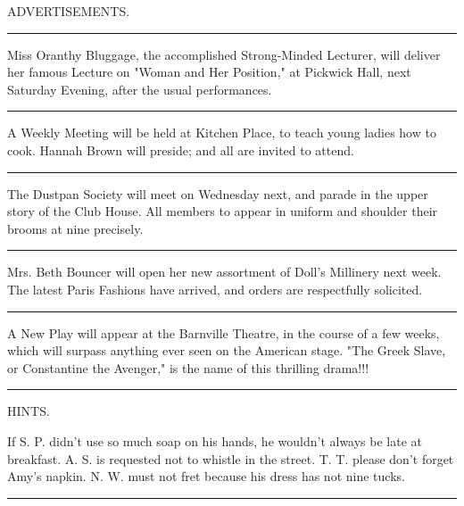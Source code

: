 ADVERTISEMENTS.

\begin{center}\rule{0.5\linewidth}{0.5pt}\end{center}

{Miss Oranthy Bluggage}, the accomplished Strong-Minded Lecturer, will
deliver her famous Lecture on "{Woman and Her Position}," at Pickwick
Hall, next Saturday Evening, after the usual performances.

\begin{center}\rule{0.5\linewidth}{0.5pt}\end{center}

{A Weekly Meeting} will be held at Kitchen Place, to teach young ladies
how to cook. Hannah Brown will preside; and all are invited to attend.

\begin{center}\rule{0.5\linewidth}{0.5pt}\end{center}

{The Dustpan Society} will meet on Wednesday next, and parade in the
upper story of the Club House. All members to appear in uniform and
shoulder their brooms at nine precisely.

\begin{center}\rule{0.5\linewidth}{0.5pt}\end{center}

{Mrs. Beth Bouncer} will open her new assortment of
Doll's Millinery next week. The latest Paris Fashions
have arrived, and orders are respectfully solicited.

\begin{center}\rule{0.5\linewidth}{0.5pt}\end{center}

{A New Play} will appear at the Barnville Theatre, in the course of a
few weeks, which will surpass anything ever seen on the American stage.
"{The Greek Slave}, or Constantine the Avenger," is the name of this
thrilling drama!!!

\begin{center}\rule{0.5\linewidth}{0.5pt}\end{center}

HINTS.

If S. P. didn't use so much soap on his hands, he
wouldn't always be late at breakfast. A. S. is requested
not to whistle in the street. T. T. please don't forget
Amy's napkin. N. W. must not fret because his dress has
not nine tucks.

\begin{center}\rule{0.5\linewidth}{0.5pt}\end{center}

